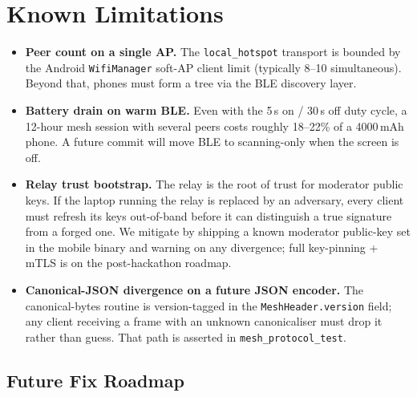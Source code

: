 \documentclass[11pt,a4paper]{article}
\begin{document}
\section{Known Limitations}
\label{sec:limits}

\begin{itemize}[leftmargin=*]
  \item \textbf{Peer count on a single AP.} The
        \texttt{local\_hotspot} transport is bounded by the Android
        \texttt{WifiManager} soft-AP client limit (typically 8--10
        simultaneous). Beyond that, phones must form a tree via the
        BLE discovery layer.
  \item \textbf{Battery drain on warm BLE.} Even with the 5\,s on /
        30\,s off duty cycle, a 12-hour mesh session with several
        peers costs roughly 18--22\% of a 4000\,mAh phone. A future
        commit will move BLE to scanning-only when the screen is off.
  \item \textbf{Relay trust bootstrap.} The relay is the root of
        trust for moderator public keys. If the laptop running the
        relay is replaced by an adversary, every client must refresh
        its keys out-of-band before it can distinguish a true
        signature from a forged one. We mitigate by shipping a known
        moderator public-key set in the mobile binary and warning on
        any divergence; full key-pinning + mTLS is on the
        post-hackathon roadmap.
  \item \textbf{Canonical-JSON divergence on a future JSON encoder.}
        The canonical-bytes routine is version-tagged in the
        \texttt{MeshHeader.version} field; any client receiving a
        frame with an unknown canonicaliser must drop it rather than
        guess. That path is asserted in \texttt{mesh\_protocol\_test}.
\end{itemize}

\subsection{Future Fix Roadmap}
\label{sec:roadmap}
\end{document}
